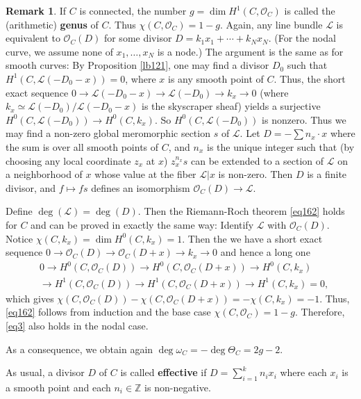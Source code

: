 \documentclass[12pt,a4paper,notitlepage]{report}
\theoremstyle{definition}
\newtheorem{rem}[df]{Remark}
\theoremstyle{plain}
\newcommand{\scr}{\mathscr}
\newcommand{\Zbb}{\mathbb Z}
\numberwithin{equation}{section}
\begin{document}
\begin{rem}\label{lb63}
If $C$ is connected, the number $g=\dim H^1(C,\scr O_C)$ is called the (arithmetic) \textbf{genus} of $C$. Thus $\chi(C,\scr O_C)=1-g$. Again, any line bundle $\scr L$ is equivalent to $\scr O_C(D)$ for some divisor $D=k_1x_1+\cdots +k_Nx_N$. (For the nodal curve, we assume none of $x_1,\dots,x_N$ is a node.) The argument is the same as for smooth curves:  By Proposition \ref{lb121}, one may find a divisor $D_0$ such that $H^1(C,\scr L(-D_0-x))=0$, where $x$ is any smooth point of $C$. Thus, the short exact sequence $0\rightarrow \scr L(-D_0-x)\rightarrow\scr L(-D_0)\rightarrow k_x\rightarrow 0$ (where $k_x\simeq\scr L(-D_0)/\scr L(-D_0-x)$ is the skyscraper sheaf) yields a surjective $H^0(C,\scr L(-D_0))\rightarrow H^0(C,k_x)$. So $H^0(C,\scr L(-D_0))$ is nonzero. Thus we may find a non-zero global meromorphic section $s$ of $\scr L$. Let $D=-\sum n_x\cdot x$ where the sum is over all smooth points of $C$, and $n_x$ is the unique integer such that (by choosing any local coordinate $z_x$ at $x$) $z_x^{n_x}s$ can be extended to a section of $\scr L$ on a neighborhood of $x$ whose value at the fiber $\scr L|x$ is non-zero. Then  $D$ is a finite divisor, and $f\mapsto fs$ defines an isomorphism $\scr O_C(D)\rightarrow \scr L$.

Define $\deg(\scr L)=\deg(D)$. Then the Riemann-Roch theorem \eqref{eq162} holds for $C$ and can be proved in exactly the same way: Identify $\scr L$ with $\scr O_C(D)$. Notice $\chi(C,k_x)=\dim H^0(C,k_x)=1$. Then the we have a short exact sequence $0\rightarrow\scr O_C(D)\rightarrow\scr O_C(D+x)\rightarrow k_x\rightarrow 0$ and hence a long one
\begin{align*}
&0\rightarrow H^0(C,\scr O_C(D))\rightarrow H^0(C,\scr O_C(D+x))\rightarrow H^0(C,k_x)\\
&\rightarrow  H^1(C,\scr O_C(D))\rightarrow H^1(C,\scr O_C(D+x))\rightarrow H^1(C,k_x)=0,
\end{align*}
which gives $\chi(C,\scr O_C(D))-\chi(C,\scr O_C(D+x))=-\chi(C,k_x)=-1$. Thus, \eqref{eq162} follows from induction and the base case $\chi(C,\scr O_C)=1-g$. Therefore, \eqref{eq3} also holds in the nodal case. 

As a consequence, we obtain again $\deg\omega_C=-\deg\Theta_C=2g-2$.
\end{rem}

As usual, a divisor $D$ of $C$ is called \textbf{effective} if $D=\sum_{i=1}^kn_ix_i$ where each $x_i$ is a smooth point and each $n_i\in\Zbb$ is non-negative.
\end{document}
